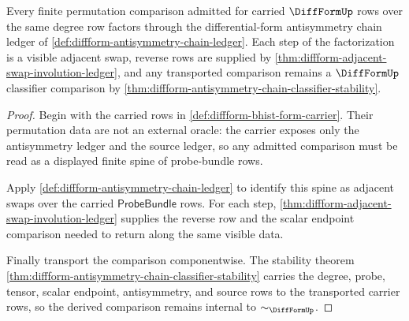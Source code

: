 \begin{theorem}
\label{thm:diffform-derived-antisymmetry-normal-form}
Every finite permutation comparison admitted for carried $\DiffFormUp$ rows
over the same degree row factors through the differential-form antisymmetry
chain ledger of \autoref{def:diffform-antisymmetry-chain-ledger}. Each step of
the factorization is a visible adjacent swap, reverse rows are supplied by
\autoref{thm:diffform-adjacent-swap-involution-ledger}, and any transported
comparison remains a $\DiffFormUp$ classifier comparison by
\autoref{thm:diffform-antisymmetry-chain-classifier-stability}.
\end{theorem}
\begin{proof}
Begin with the carried rows in
\autoref{def:diffform-bhist-form-carrier}. Their permutation data are not an
external oracle: the carrier exposes only the antisymmetry ledger and the source
ledger, so any admitted comparison must be read as a displayed finite spine of
probe-bundle rows.

Apply \autoref{def:diffform-antisymmetry-chain-ledger} to identify this spine
as adjacent swaps over the carried $\mathsf{ProbeBundle}$ rows. For each step,
\autoref{thm:diffform-adjacent-swap-involution-ledger} supplies the reverse row
and the scalar endpoint comparison needed to return along the same visible
data.

Finally transport the comparison componentwise. The stability theorem
\autoref{thm:diffform-antisymmetry-chain-classifier-stability} carries the
degree, probe, tensor, scalar endpoint, antisymmetry, and source rows to the
transported carrier rows, so the derived comparison remains internal to
$\sim_{\DiffFormUp}$.
\end{proof}

